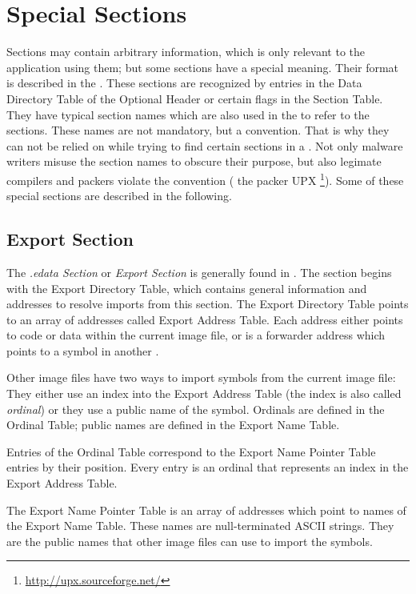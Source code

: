 \section{Special Sections} \label{sec:specialsections}

Sections may contain arbitrary information, which is only relevant to the application using them; but some sections have a special meaning. Their format is described in the \PECOFF{} \cite[]{pespec}. These sections are recognized by entries in the Data Directory Table of the Optional Header or certain flags in the Section Table. They have typical section names which are also used in the \PECOFF{} to refer to the sections. These names are not mandatory, but a convention. That is why they can not be relied on while trying to find certain sections in a \PE{}. Not only malware writers misuse the section names to obscure their purpose, but also legimate compilers and packers violate the convention (\eg{} the packer UPX \footnote{\url{http://upx.sourceforge.net/}}).
Some of these special sections are described in the following. 

\subsection*{Export Section} \label{subsec:idata}

The \emph{.edata Section} or \emph{Export Section} is generally found in . The section begins with the Export Directory Table, which contains general information and addresses to resolve imports from this section. The Export Directory Table points to an array of addresses called Export Address Table. Each address either points to code or data within the current image file, or is a forwarder address which points to a symbol in another \DLL{}. 

Other image files have two ways to import symbols from the current image file: They either use an index into the Export Address Table (the index is also called \emph{ordinal}) or they use a public name of the symbol. Ordinals are defined in the Ordinal Table; public names are defined in the Export Name Table.

Entries of the Ordinal Table correspond to the Export Name Pointer Table entries by their position. Every entry is an ordinal that represents an index in the Export Address Table.

The Export Name Pointer Table is an array of addresses which point to names of the Export Name Table. These names are null-terminated ASCII strings. They are the public names that other image files can use to import the symbols.

